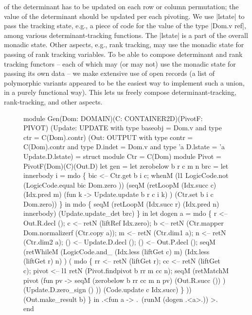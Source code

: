\documentclass{llncs}
\begin{document}
of the determinant has to be updated on each row or column
permutation; the value of the determinant should be updated per each
pivoting. We use |lstate| to pass the tracking state, e.g., a piece of
code for the value of the type |Dom.v ref|, among
various determinant-tracking functions. The |lstate| is a part of the
overall monadic state. Other aspects, e.g., rank tracking, may use the
monadic state for passing of rank tracking variables. To be able to
compose determinant and rank tracking functors -- each of which may
(or may not) use the monadic state for passing its own data -- we make
extensive use of open records (a list of polymorphic variants
appeared to be the easiest way to implement such a union, in a purely
functional way). This lets us freely compose determinant-tracking,
rank-tracking, and other aspects.

\begin{figure}
\begin{code}
module Gen(Dom: DOMAIN)(C: CONTAINER2D)(PivotF: PIVOT)
          (Update: UPDATE with type baseobj = Dom.v and type ctr = C(Dom).contr)
          (Out: OUTPUT with type contr = C(Dom).contr and type D.indet = Dom.v 
                        and type 'a D.lstate = 'a Update.D.lstate) = struct
    module Ctr = C(Dom)
    module Pivot = PivotF(Dom)(C)(Out.D)
    let gen =
      let zerobelow b r c m n brc =
        let innerbody i = mdo \{
            bic <-- Ctr.get b i c;
            whenM (l1 LogicCode.not (LogicCode.equal bic Dom.zero ))
                (seqM (retLoopM (Idx.succ c) (Idx.pred m)
                          (fun k -> Update.update b r c i k) )
                      (Ctr.set b i c Dom.zero)) \} in 
        mdo \{
              seqM (retLoopM (Idx.succ r) (Idx.pred n) innerbody) 
                   (Update.update_det brc) \} in
      let dogen a = mdo \{
          r <-- Out.R.decl ();
          c <-- retN (liftRef Idx.zero);
          b <-- retN (Ctr.mapper Dom.normalizerf (Ctr.copy a));
          m <-- retN (Ctr.dim1 a);
          n <-- retN (Ctr.dim2 a);
          () <-- Update.D.decl ();
          () <-- Out.P.decl ();
          seqM 
            (retWhileM (LogicCode.and_ (Idx.less (liftGet c) m)
                                       (Idx.less (liftGet r) n) )
               ( mdo \{
               rr <-- retN (liftGet r);
               cc <-- retN (liftGet c);
               pivot <-- l1 retN (Pivot.findpivot b rr m cc n);
               seqM (retMatchM pivot (fun pv -> 
                        seqM (zerobelow b rr cc m n pv)
                             (Out.R.succ ()) )
                        (Update.D.zero_sign () ))
                    (Code.update c Idx.succ) \} ))
            (Out.make_result b) \} in
    .<fun a -> .~(runM (dogen .<a>.)) >.
end
\end{code}
\end{figure}
\end{document}
